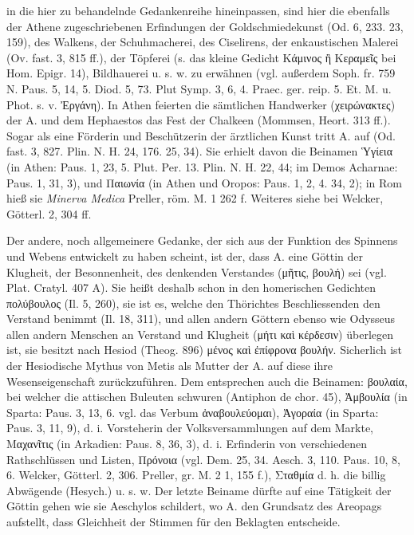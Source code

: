 \documentclass[a4paper, 11pt, oneside]{article}
\begin{document}
in die hier zu behandelnde Gedankenreihe hineinpassen, sind hier die ebenfalls der Athene zugeschriebenen Erfindungen der Goldschmiedekunst (Od. 6, 233. 23, 159), des Walkens, der Schuhmacherei, des Ciselirens, der enkaustischen Malerei (Ov. fast. 3, 815 ff.), der Töpferei (s. das kleine Gedicht Κάμινος ἢ Κεραμεῖς bei Hom. Epigr. 14), Bildhauerei u. s. w. zu erwähnen (vgl. außerdem Soph. fr. 759 N. Paus. 5, 14, 5. Diod. 5, 73. Plut Symp. 3, 6, 4. Praec. ger. reip. 5. Et. M. u. Phot. s. v. Ἐργάνη). In Athen feierten die sämtlichen Handwerker (χειρώνακτες) der A. und dem Hephaestos das Fest der Chalkeen (Mommsen, Heort. 313 ff.). Sogar als eine Förderin und Beschützerin der ärztlichen Kunst tritt A. auf (Od. fast. 3, 827. Plin. N. H. 24, 176. 25, 34). Sie erhielt davon die Beinamen Ὑγίεια (in Athen: Paus. 1, 23, 5. Plut. Per. 13. Plin. N. H. 22, 44; im Demos Acharnae: Paus. 1, 31, 3), und Παιωνία (in Athen und Oropos: Paus. 1, 2, 4. 34, 2); in Rom hieß sie \emph{Minerva Medica} Preller, röm. M. 1 262 f. Weiteres siehe bei Welcker, Götterl. 2, 304 ff.

Der andere, noch allgemeinere Gedanke, der sich aus der Funktion des Spinnens und Webens entwickelt zu haben scheint, ist der, dass A. eine Göttin der Klugheit, der Besonnenheit, des denkenden Verstandes (μῆτις, βουλή) sei (vgl. Plat. Cratyl. 407 A). Sie heißt deshalb schon in den homerischen Gedichten πολύβουλος (Il. 5, 260), sie ist es, welche den Thörichtes Beschliessenden den Verstand benimmt (Il. 18, 311), und allen andern Göttern ebenso wie Odysseus allen andern Menschen an Verstand und Klugheit (μήτι καὶ κέρδεσιν) überlegen ist, sie besitzt nach Hesiod (Theog. 896) μένος καὶ ἐπίφρονα βουλήν. Sicherlich ist der Hesiodische Mythus von Metis als Mutter der A. auf diese ihre Wesenseigenschaft zurückzuführen. Dem entsprechen auch die Beinamen: βουλαία, bei welcher die attischen Buleuten schwuren (Antiphon de chor. 45), Ἀμβουλία (in Sparta: Paus. 3, 13, 6. vgl. das Verbum ἀναβουλεύομαι), Ἀγοραία (in Sparta: Paus. 3, 11, 9), d. i. Vorsteherin der Volksversammlungen auf dem Markte, Μαχανῖτις (in Arkadien: Paus. 8, 36, 3), d. i. Erfinderin von verschiedenen Rathschlüssen und Listen, Πρόνοια (vgl. Dem. 25, 34. Aesch. 3, 110. Paus. 10, 8, 6. Welcker, Götterl. 2, 306. Preller, gr. M. 2 1, 155 f.), Σταθμία d. h. die billig Abwägende (Hesych.) u. s. w. Der letzte Beiname dürfte auf eine Tätigkeit der Göttin gehen wie sie Aeschylos schildert, wo A. den Grundsatz des Areopags aufstellt, dass Gleichheit der Stimmen für den Beklagten entscheide.
\end{document}
